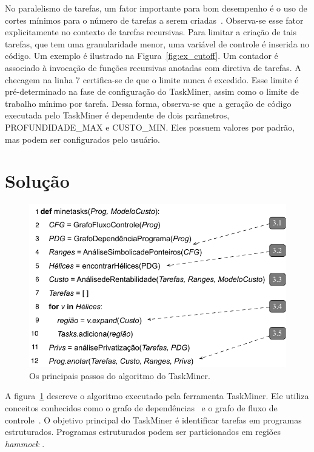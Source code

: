\documentclass[sigplan,10pt,review]{acmart}
\newcommand\Taskminer{\mbox{\textsf{TaskMiner}}}
\begin{document}
No paralelismo de tarefas, um fator importante para bom desempenho
é o uso de cortes mínimos para o número de tarefas a serem criadas~\cite{Duran08b}. 
Observa-se esse fator explicitamente no contexto de tarefas recursivas. 
Para limitar a criação de tais tarefas, que tem uma granularidade menor,
uma variável de controle é inserida no código. 
Um exemplo é ilustrado na Figura~\ref{fig:ex_cutoff}. 
Um contador é associado à invocação de funções recursivas anotadas com diretiva de tarefas. 
A checagem na linha 7 certifica-se de que o limite
nunca é excedido. Esse limite é pré-determinado na fase de configuração do 
{\Taskminer}, assim como o limite de trabalho mínimo
por tarefa. Dessa forma, observa-se que a geração 
de código executada pelo {\Taskminer} é dependente de dois parâmetros,
\textsf{PROFUNDIDADE\_MAX} e \textsf{CUSTO\_MIN}. 
Eles possuem valores por padrão, mas podem ser configurados pelo usuário.	

\section{Solu\c{c}\~{a}o}
\label{sec:sol}

\begin{figure}[b]
\begin{center}
\includegraphics[width=1\columnwidth]{images/alg_main}
\caption{Os principais passos do algoritmo do TaskMiner.}
\label{fig:alg_main}
\end{center}
\end{figure}

A figura~\ref{fig:alg_main} descreve o algoritmo executado pela ferramenta {\Taskminer}. Ele utiliza conceitos conhecidos como
o grafo de dependências~\cite{Ferrante87} e o grafo de fluxo de controle~\cite{Kildall73}. O objetivo principal do {\Taskminer}
é identificar tarefas em programas estruturados. Programas estruturados podem ser particionados em regiões \textit{hammock}
\cite{Ferrante87}.
\end{document}
